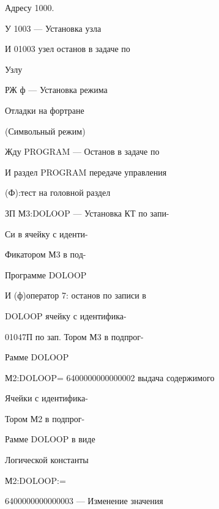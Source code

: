 \documentclass[11pt,a4paper]{article}
\begin{document}
\begin{center}Адресу 1000.\end{center}
У 1003 --- Установка узла

И 01003 узел останов в задаче по

\begin{center}Узлу\end{center}
РЖ ф --- Установка режима

\begin{center}Отладки на фортране\end{center}
\begin{center}(Символьный режим)\end{center}
Жду PROGRAM --- Останов в задаче по

И раздел PROGRAM передаче управления

\begin{center}(Ф):тест на головной раздел\end{center}
ЗП М3:DOLOOP --- Установка КТ по запи-

\begin{center}Си в ячейку с иденти-\end{center}
\begin{center}Фикатором М3 в под-\end{center}
\begin{center}Программе DOLOOP\end{center}
И (ф)оператор 7: останов по записи в

\begin{center}DOLOOP ячейку с идентифика-\end{center}
\begin{center}01047П по зап. Тором М3 в подпрог-\end{center}
\begin{center}Рамме DOLOOP\end{center}
М2:DOLOOP= 6400000000000002 выдача содержимого

\begin{center}Ячейки с идентифика-\end{center}
\begin{center}Тором М2 в подпрог-\end{center}
\begin{center}Рамме DOLOOP в виде\end{center}
\begin{center}Логической константы\end{center}
М2:DOLOOP:=

6400000000000003 --- Изменение значения
\end{document}
